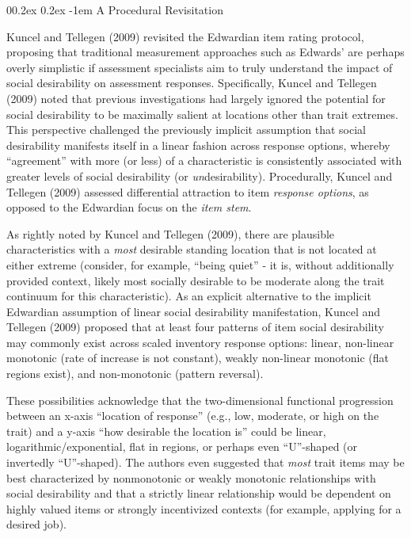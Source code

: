 \documentclass[
  ,jou]{apa6}
\makeatletter
\let\oldparagraph\paragraph
\renewcommand{\paragraph}[1]{\oldparagraph{#1}\mbox{}}
\renewcommand{\paragraph}{\@startsection{paragraph}{4}{\parindent}%
  {0\baselineskip \@plus 0.2ex \@minus 0.2ex}%
  {-1em}%
  {\normalfont\normalsize\bfseries\itshape\typesectitle}}
\makeatother
\begin{document}
\hypertarget{a-procedural-revisitation}{%
\paragraph{A Procedural Revisitation}\label{a-procedural-revisitation}}

Kuncel and Tellegen (2009) revisited the Edwardian item rating protocol, proposing that traditional measurement approaches such as Edwards' are perhaps overly simplistic if assessment specialists aim to truly understand the impact of social desirability on assessment responses. Specifically, Kuncel and Tellegen (2009) noted that previous investigations had largely ignored the potential for social desirability to be maximally salient at locations other than trait extremes. This perspective challenged the previously implicit assumption that social desirability manifests itself in a linear fashion across response options, whereby ``agreement'' with more (or less) of a characteristic is consistently associated with greater levels of social desirability (or \emph{un}desirability). Procedurally, Kuncel and Tellegen (2009) assessed differential attraction to item \emph{response options}, as opposed to the Edwardian focus on the \emph{item stem}.

As rightly noted by Kuncel and Tellegen (2009), there are plausible characteristics with a \emph{most} desirable standing location that is not located at either extreme (consider, for example, ``being quiet'' - it is, without additionally provided context, likely most socially desirable to be moderate along the trait continuum for this characteristic). As an explicit alternative to the implicit Edwardian assumption of linear social desirability manifestation, Kuncel and Tellegen (2009) proposed that at least four patterns of item social desirability may commonly exist across scaled inventory response options: linear, non-linear monotonic (rate of increase is not constant), weakly non-linear monotonic (flat regions exist), and non-monotonic (pattern reversal).

These possibilities acknowledge that the two-dimensional functional progression between an x-axis ``location of response'' (e.g., low, moderate, or high on the trait) and a y-axis ``how desirable the location is'' could be linear, logarithmic/exponential, flat in regions, or perhaps even ``U''-shaped (or invertedly ``U''-shaped). The authors even suggested that \emph{most} trait items may be best characterized by nonmonotonic or weakly monotonic relationships with social desirability and that a strictly linear relationship would be dependent on highly valued items or strongly incentivized contexts (for example, applying for a desired job).
\end{document}
